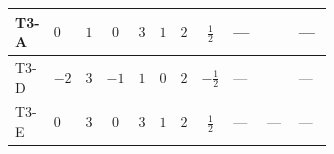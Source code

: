 \documentclass[8pt]{article}
\begin{document}
\begin{landscape}
\begin{longtable}{@{}llcccccc >{\raggedright\arraybackslash}p{0.21\linewidth} >{\raggedright\arraybackslash}p{0.21\linewidth} >{\raggedright\arraybackslash}p{0.21\linewidth}@{}}
\midrule
T3-A & $0$ & $1$ & $0$ & $3$ & $1$ & $2$ & $\frac{1}{2}$ & --- & \scriptsize\adjustbox{max width=\linewidth}{$\begin{gathered} 4 {\lambda_{T3}} \left({\lambda_{T3}}\right)^{*}\end{gathered}$} & --- \\
\midrule
T3-D & $-2$ & $3$ & $-1$ & $1$ & $0$ & $2$ & $-\frac{1}{2}$ & --- & \scriptsize\adjustbox{max width=\linewidth}{$\begin{gathered} 4 {\lambda_{T3}} \left({\lambda_{T3}}\right)^{*}\end{gathered}$} & --- \\
\midrule
T3-E & $0$ & $3$ & $0$ & $3$ & $1$ & $2$ & $\frac{1}{2}$ & --- & --- & --- \\
\midrule
\bottomrule
\end{longtable}
\clearpage

\end{landscape}
\end{document}
